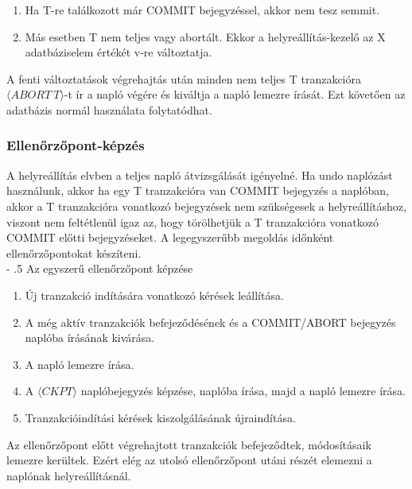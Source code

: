 \documentclass[margin=0px]{article}
\makeatletter
\renewcommand\paragraph{%
	\@startsection{paragraph}{4}{0mm}%
	{-\baselineskip}%
	{.5\baselineskip}%
	{\normalfont\normalsize\bfseries}}
\makeatother
\begin{document}
	\begin{enumerate}
		\item	Ha T-re találkozott már COMMIT bejegyzéssel, akkor nem tesz semmit.
		\item	Más esetben T nem teljes vagy abortált. Ekkor a helyreállítás-kezelő az X adatbáziselem értékét v-re változtatja.
	\end{enumerate}
	
	A fenti változtatások végrehajtás után minden nem teljes T tranzakcióra $\langle ABORT \ T \rangle$-t ír a napló végére és
	kiváltja a napló lemezre írását. Ezt követően az adatbázis normál használata folytatódhat.
	
	\subsubsection{Ellenőrzőpont-képzés}
	
	A helyreállítás elvben a teljes napló átvizsgálását igényelné. Ha undo naplózást használunk, akkor ha egy T tranzakcióra
	van COMMIT bejegyzés a naplóban, akkor a T tranzakcióra vonatkozó bejegyzések nem szükségesek a helyreállításhoz, viszont
	nem feltétlenül igaz az, hogy törölhetjük a T tranzakcióra vonatkozó COMMIT előtti bejegyzéseket. A legegyszerűbb megoldás
	időnként ellenőrzőpontokat készíteni.\\
	
	\paragraph{Az egyszerű ellenőrzőpont képzése}
	\begin{enumerate}
		\item	Új tranzakció indítására vonatkozó kérések leállítása.
		\item	A még aktív tranzakciók befejeződésének és a COMMIT/ABORT bejegyzés naplóba írásának kivárása.
		\item	A napló lemezre írása.
		\item	A $\langle CKPT \rangle$ naplóbejegyzés képzése, naplóba írása, majd a napló lemezre írása.
		\item	Tranzakcióindítási kérések kiszolgálásának újraindítása.
	\end{enumerate}
	
	Az ellenőrzőpont előtt végrehajtott tranzakciók befejeződtek, módosításaik lemezre kerültek. Ezért elég az utolsó ellenőrzőpont utáni
	részét elemezni a naplónak helyreállításnál.\\
	
\end{document}
